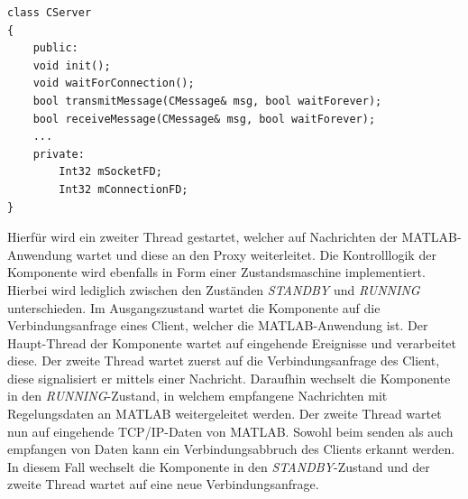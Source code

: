 \begin{lstlisting}
class CServer
{
	public:
	void init();
	void waitForConnection();
	bool transmitMessage(CMessage& msg, bool waitForever);
	bool receiveMessage(CMessage& msg, bool waitForever);
	...
	private:
		Int32 mSocketFD;
		Int32 mConnectionFD;
}
\end{lstlisting}

Hierfür wird ein zweiter Thread gestartet, welcher auf Nachrichten der MATLAB-Anwendung wartet und diese an den Proxy weiterleitet. Die Kontrolllogik der Komponente wird ebenfalls in Form einer Zustandsmaschine implementiert. Hierbei wird lediglich zwischen den Zuständen \textit{STANDBY} und \textit{RUNNING} unterschieden. Im Ausgangszustand wartet die Komponente auf die Verbindungsanfrage eines Client, welcher die MATLAB-Anwendung ist. Der Haupt-Thread der Komponente wartet auf eingehende Ereignisse und verarbeitet diese. Der zweite Thread wartet zuerst auf die Verbindungsanfrage des Client, diese signalisiert er mittels einer Nachricht. Daraufhin wechselt die Komponente in den \textit{RUNNING}-Zustand, in welchem empfangene Nachrichten mit Regelungsdaten an MATLAB weitergeleitet werden. Der zweite Thread wartet nun auf eingehende TCP/IP-Daten von MATLAB. Sowohl beim senden als auch empfangen von Daten kann ein Verbindungsabbruch des Clients erkannt werden. In diesem Fall wechselt die Komponente in den \textit{STANDBY}-Zustand und der zweite Thread wartet auf eine neue Verbindungsanfrage.